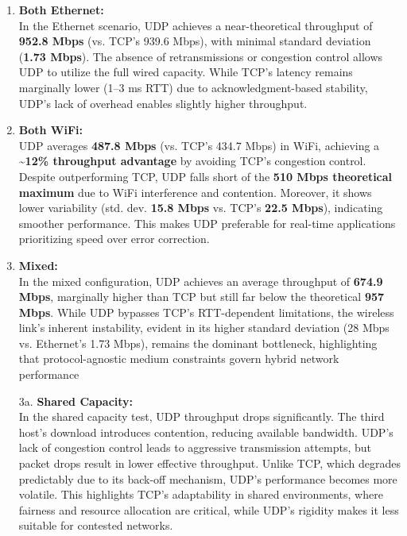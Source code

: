         \begin{enumerate}
            \item \textbf{Both Ethernet:} \\
                In the Ethernet scenario, UDP achieves a near-theoretical throughput of \textbf{952.8 Mbps} (vs. TCP’s 939.6 Mbps), with minimal standard deviation (\textbf{1.73 Mbps}). The absence of retransmissions or congestion control allows UDP to utilize the full wired capacity. While TCP’s latency remains marginally lower (1–3 ms RTT) due to acknowledgment-based stability, UDP’s lack of overhead enables slightly higher throughput.
            \\

            \item \textbf{Both WiFi:} \\
            UDP averages \textbf{487.8 Mbps} (vs. TCP’s 434.7 Mbps) in WiFi, achieving a \textbf{\textasciitilde 12\% throughput advantage} by avoiding TCP’s congestion control. Despite outperforming TCP, UDP falls short of the \textbf{510 Mbps theoretical maximum} due to WiFi interference and contention. Moreover, it shows lower variability (std. dev. \textbf{15.8 Mbps} vs. TCP’s \textbf{22.5 Mbps}), indicating smoother performance. This makes UDP preferable for real-time applications prioritizing speed over error correction.
            \\

            \item \textbf{Mixed:} \\
                In the mixed configuration, UDP achieves an average throughput of \textbf{674.9 Mbps}, marginally higher than TCP but still far below the theoretical \textbf{957 Mbps}. While UDP bypasses TCP’s RTT-dependent limitations, the wireless link’s inherent instability, evident in its higher standard deviation (28 Mbps vs. Ethernet’s 1.73 Mbps), remains the dominant bottleneck, highlighting that protocol-agnostic medium constraints govern hybrid network performance
            \\

            \item[3a.] \textbf{Shared Capacity:} \\
                In the shared capacity test, UDP throughput drops significantly. The third host’s download introduces contention, reducing available bandwidth. UDP’s lack of congestion control leads to aggressive transmission attempts, but packet drops result in lower effective throughput. Unlike TCP, which degrades predictably due to its back-off mechanism, UDP’s performance becomes more volatile. This highlights TCP’s adaptability in shared environments, where fairness and resource allocation are critical, while UDP’s rigidity makes it less suitable for contested networks.
        \end{enumerate}
    